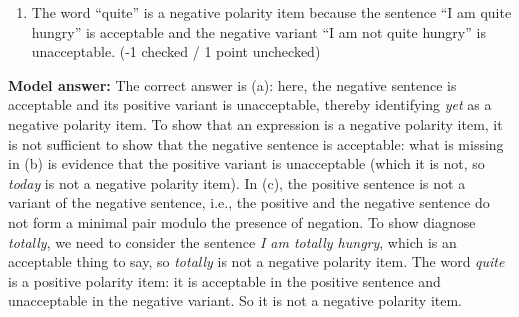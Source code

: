 \documentclass[a4,11pt]{article}
\begin{document}
\begin{enumerate}[leftmargin = 12pt]
\begin{enumerate}[noitemsep]
      \item The word ``quite'' is a negative polarity item because the sentence ``I am quite hungry'' is acceptable and the negative variant ``I am not quite hungry'' is unacceptable. (-1 checked / 1 point unchecked)
      
   \end{enumerate}
   
 {\bf Model answer:} The correct answer is (a): here, the negative sentence is acceptable and its positive variant is unacceptable, thereby identifying {\em yet} as a negative polarity item. To show that an expression is a negative polarity item, it is not sufficient to show that the negative sentence is acceptable: what is missing in (b) is evidence that the positive variant is unacceptable (which it is not, so {\em today} is not a negative polarity item). In (c), the positive sentence is not a variant of the negative sentence, i.e., the positive and the negative sentence do not form a minimal pair modulo the presence of negation. To show diagnose {\em totally}, we need to consider the sentence {\em I am totally hungry}, which is an acceptable thing to say, so {\em totally} is not a negative polarity item. The word {\em quite} is a positive polarity item: it is acceptable in the positive sentence and unacceptable in the negative variant. So it is not a negative polarity item.

\end{enumerate}
\end{document}
